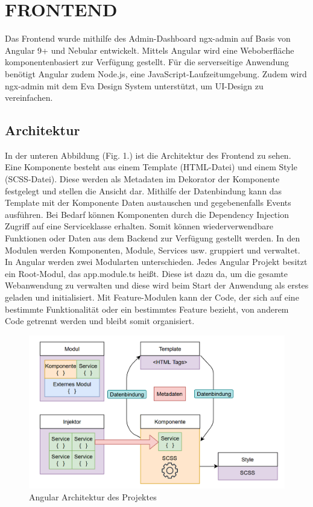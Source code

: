 \section{FRONTEND}\label{ch:frontend}

Das Frontend wurde mithilfe des Admin-Dashboard ngx-admin auf Basis von Angular 9+ und Nebular entwickelt. Mittels Angular wird eine Weboberfläche komponentenbasiert zur Verfügung gestellt. Für die serverseitige Anwendung benötigt Angular zudem Node.js, eine JavaScript-Laufzeitumgebung. Zudem wird ngx-admin mit dem Eva Design System unterstützt, um UI-Design zu vereinfachen. 

\subsection{Architektur}

In der unteren Abbildung (Fig. 1.) ist die Architektur des Frontend zu sehen. Eine Komponente besteht aus einem Template (HTML-Datei) und einem Style (SCSS-Datei). Diese werden als Metadaten im Dekorator der Komponente festgelegt und stellen die Ansicht dar. Mithilfe der Datenbindung kann das Template mit der Komponente Daten austauschen und gegebenenfalls Events ausführen. Bei Bedarf können Komponenten durch die Dependency Injection Zugriff auf eine Serviceklasse erhalten. Somit können wiederverwendbare Funktionen oder Daten aus dem Backend zur Verfügung gestellt werden. In den Modulen werden Komponenten, Module, Services usw. gruppiert und verwaltet. In Angular werden zwei Modularten unterschieden. Jedes Angular Projekt besitzt ein Root-Modul, das app.module.ts heißt. Diese ist dazu da, um die gesamte Webanwendung zu verwalten und diese wird beim Start der Anwendung als erstes geladen und initialisiert. Mit Feature-Modulen kann der Code, der sich auf eine bestimmte Funktionalität oder ein bestimmtes Feature bezieht, von anderem Code getrennt werden und bleibt somit organisiert.

\begin{figure}[thpb]
      \centering
      \includegraphics[scale=0.55]{img/frontend_architecture.png}
      \caption{Angular Architektur des Projektes}
      \label{fig:frontend}
 \end{figure}


